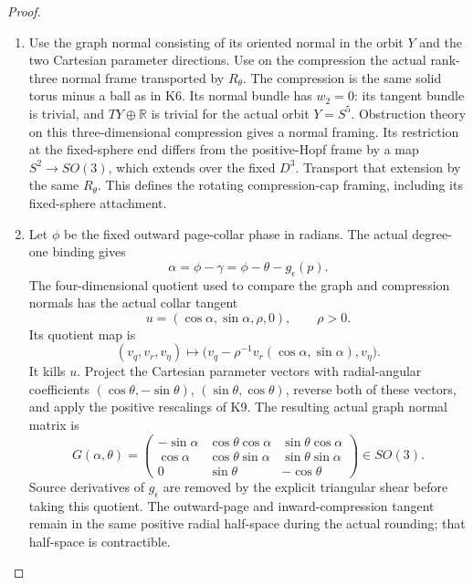 \begin{proof}
\begin{enumerate}[label=\arabic*.]
\item Use the graph normal consisting of its oriented normal in the
orbit \(Y\) and the two Cartesian parameter directions.
Use on the compression the actual rank-three normal frame
transported by \(R_\theta\). The compression is the same solid
torus minus a ball as in K6. Its normal bundle has \(w_2=0\):
its tangent bundle is trivial, and \(TY\oplus\mathbb R\) is
trivial for the actual orbit \(Y=S^5\). Obstruction theory on
this three-dimensional compression gives a normal framing.
Its restriction at the fixed-sphere end differs from the
positive-Hopf frame by a map \(S^2\to SO(3)\), which extends
over the fixed \(D^3\). Transport that extension by the same
\(R_\theta\). This defines the rotating compression-cap
framing, including its fixed-sphere attachment.

\item Let \(\phi\) be the fixed outward page-collar phase in radians.
The actual degree-one binding gives
\[
                  \alpha=\phi-\gamma
                         =\phi-\theta-g_\epsilon(p).
\]
The four-dimensional quotient used to compare the graph and
compression normals has the actual collar tangent
\[
             u=(\cos\alpha,\sin\alpha,\rho,0),
             \qquad \rho>0.
\]
Its quotient map is
\[
 (v_q,v_r,v_\eta)\longmapsto
       \bigl(v_q-\rho^{-1}v_r(\cos\alpha,\sin\alpha),v_\eta\bigr).
\]
It kills \(u\). Project the Cartesian parameter vectors
with radial-angular coefficients
\((\cos\theta,-\sin\theta)\), \((\sin\theta,\cos\theta)\),
reverse both of these vectors, and apply the positive
rescalings of K9. The resulting actual graph normal matrix is
\[
 G(\alpha,\theta)=
 \begin{pmatrix}
 -\sin\alpha&\cos\theta\cos\alpha&\sin\theta\cos\alpha\\
 \cos\alpha&\cos\theta\sin\alpha&\sin\theta\sin\alpha\\
 0&\sin\theta&-\cos\theta
 \end{pmatrix}\in SO(3).
\]
Source derivatives of \(g_\epsilon\) are removed by the
explicit triangular shear before taking this quotient.
The outward-page and inward-compression tangent remain
in the same positive radial half-space during the actual
rounding; that half-space is contractible.


\end{enumerate}
\end{proof}
